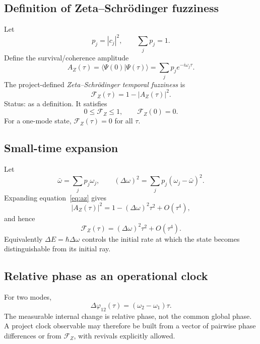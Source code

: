 \subsection{Definition of Zeta--Schrödinger fuzziness}

Let
\begin{equation}
p_j=|c_j|^2,
\qquad \sum_jp_j=1.
\end{equation}
Define the survival/coherence amplitude
\begin{equation}
\boxed{
A_Z(\tau)
=\langle\Psi(0)|\Psi(\tau)\rangle
=\sum_jp_j e^{-i\omega_j\tau}.
}
\label{eq:az}
\end{equation}
The project-defined \emph{Zeta--Schrödinger temporal fuzziness} is
\begin{equation}
\boxed{
\mathcal F_Z(\tau)=1-|A_Z(\tau)|^2.
}
\label{eq:fuzziness}
\end{equation}
Status:  as a definition. It satisfies
\begin{equation}
0\le \mathcal F_Z\le1,
\qquad
\mathcal F_Z(0)=0.
\end{equation}
For a one-mode state, \(\mathcal F_Z(\tau)=0\) for all \(\tau\).

\subsection{Small-time expansion}

Let
\begin{equation}
\bar\omega=\sum_jp_j\omega_j,
\qquad
(\Delta\omega)^2=\sum_jp_j(\omega_j-\bar\omega)^2.
\end{equation}
Expanding equation~\eqref{eq:az} gives
\begin{equation}
\boxed{
|A_Z(\tau)|^2
=1-(\Delta\omega)^2\tau^2+O(\tau^4),
}
\end{equation}
and hence
\begin{equation}
\boxed{
\mathcal F_Z(\tau)
=(\Delta\omega)^2\tau^2+O(\tau^4).
}
\label{eq:fuzz-small}
\end{equation}
Equivalently \(\Delta E=\hbar\Delta\omega\) controls the initial rate at which the state becomes distinguishable from its initial ray.

\subsection{Relative phase as an operational clock}

For two modes,
\begin{equation}
\Delta\varphi_{12}(\tau)
=(\omega_2-\omega_1)\tau.
\end{equation}
The measurable internal change is relative phase, not the common global phase. A project clock observable may therefore be built from a vector of pairwise phase differences or from \(\mathcal F_Z\), with revivals explicitly allowed.

